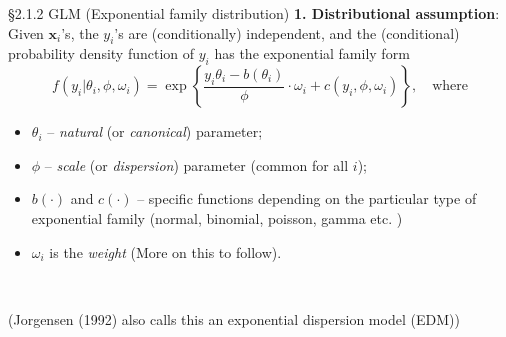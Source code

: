 \documentclass{beamer}
\newenvironment{wideitemize}%
  {\begin{itemize}%
    \setlength{\parskip}{1em}}%
  {\end{itemize}}
\begin{document}
\begin{frame}{\S2.1.2 GLM (Exponential family distribution)}
\noindent
\textbf{1. Distributional assumption}: Given $\textbf{x}_i$'s, the $y_i$'s are (conditionally) independent, and the (conditional) probability density function of $y_i$ has the \alert {exponential family form}
$$f(y_i|\theta_i, \phi, \omega_i)=\exp\left\{\frac{y_i\theta_i-b(\theta_i)}{\phi}\cdot \omega_i +
c(y_i,\phi, \omega_i)\right\}, \quad \mbox{where}$$

\begin{wideitemize}
\item
$\theta_i$ -- \textit{natural} (or \textit{canonical}) parameter;
\item
$\phi$ --  \textit{scale} (or \textit{dispersion}) parameter (common for all $i$);
\item
$b(\cdot)$ and $c(\cdot)$ --  specific functions depending on the particular  type of exponential family (normal, binomial, poisson, gamma etc. )
\item
$\omega_i$ is the \textit{weight} (More on this to follow). 
\end{wideitemize}

\ \

\begin{center}
(Jorgensen (1992) also calls this an exponential dispersion model (EDM))
\end{center}
\end{frame}
\end{document}
